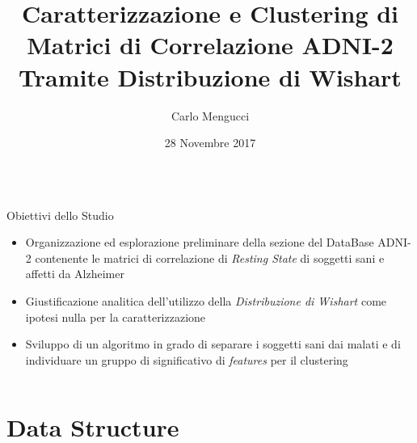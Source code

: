 \documentclass{beamer}
\title{\textbf{Caratterizzazione e Clustering di Matrici di Correlazione ADNI-2 Tramite Distribuzione di Wishart }}
\author{Carlo Mengucci}
\date{28 Novembre 2017}
\institute{ALMA MATER STUDIORUM $\cdot$ UNIVERSIT\'A DI BOLOGNA}
\begin{document}
\begin{frame}
\maketitle
\end{frame}

\begin{frame}
\begin {columns}
\begin{column}{0.8\linewidth}
\begin{block}{Obiettivi dello Studio}

\begin{itemize}
\item Organizzazione ed esplorazione preliminare della sezione del DataBase ADNI-2 contenente le matrici di correlazione di \textit{Resting State} di soggetti sani e affetti da Alzheimer

\item Giustificazione analitica dell'utilizzo della \textit{Distribuzione di Wishart} come ipotesi nulla per la caratterizzazione 

\item Sviluppo di un algoritmo in grado di separare i soggetti sani dai malati e di individuare un gruppo di significativo di \textit{features}  per il clustering
\end{itemize}

\end{block}


\end{column}
\end{columns}
\end{frame}	

\section{Data Structure}
\end{document}
